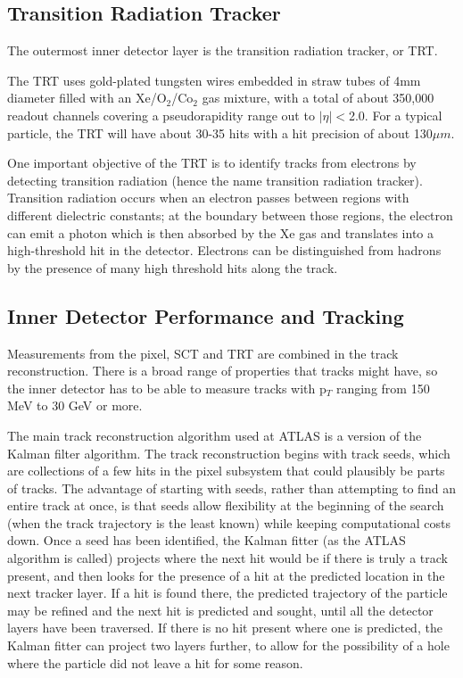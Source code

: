 \subsection{Transition Radiation Tracker}
\label{sec:trt}
The outermost inner detector layer is the transition radiation tracker, or TRT.  

The TRT uses gold-plated tungsten wires embedded in straw tubes of 4mm diameter filled with an Xe/O$_2$/Co$_2$ gas mixture, with a total of about 350,000 readout channels covering a pseudorapidity range out to $|\eta|<$2.0.  For a typical particle, the TRT will have about 30-35 hits with a hit precision of about 130$\mu m$.

One important objective of the TRT is to identify tracks from electrons by detecting transition radiation (hence the name transition radiation tracker).  Transition radiation occurs when an electron passes between regions with different dielectric constants; at the boundary between those regions, the electron can emit a photon which is then absorbed by the Xe gas and translates into a high-threshold hit in the detector.  Electrons can be distinguished from hadrons by the presence of many high threshold hits along the track.

 
\subsection{Inner Detector Performance and Tracking}
\label{sec:id_perf}
Measurements from the pixel, SCT and TRT are combined in the track reconstruction.  There is a broad range of properties that tracks might have, so the inner detector has to be able to measure tracks with p$_T$ ranging from 150 MeV to 30 GeV or more.   

The main track reconstruction algorithm used at ATLAS is a version of the Kalman filter algorithm.  The track reconstruction begins with track seeds, which are collections of a few hits in the pixel subsystem that could plausibly be parts of tracks.  The advantage of starting with seeds, rather than attempting to find an entire track at once, is that seeds allow flexibility at the beginning of the search (when the track trajectory is the least known) while keeping computational costs down.  Once a seed has been identified, the Kalman fitter (as the ATLAS algorithm is called) projects where the next hit would be if there is truly a track present, and then looks for the presence of a hit at the predicted location in the next tracker layer.  If a hit is found there, the predicted trajectory of the particle may be refined and the next hit is predicted and sought, until all the detector layers have been traversed. If there is no hit present where one is predicted, the Kalman fitter can project two layers further, to allow for the possibility of a hole where the particle did not leave a hit for some reason. 


